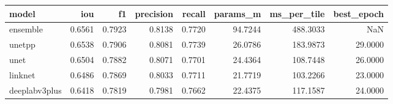 \begin{tabular}{lrrrrrrr}
\toprule
model & iou & f1 & precision & recall & params_m & ms_per_tile & best_epoch \\
\midrule
ensemble & 0.6561 & 0.7923 & 0.8138 & 0.7720 & 94.7244 & 488.3033 & NaN \\
unetpp & 0.6538 & 0.7906 & 0.8081 & 0.7739 & 26.0786 & 183.9873 & 29.0000 \\
unet & 0.6504 & 0.7882 & 0.8071 & 0.7701 & 24.4364 & 108.7448 & 26.0000 \\
linknet & 0.6486 & 0.7869 & 0.8033 & 0.7711 & 21.7719 & 103.2266 & 23.0000 \\
deeplabv3plus & 0.6418 & 0.7819 & 0.7981 & 0.7662 & 22.4375 & 117.1587 & 24.0000 \\
\bottomrule
\end{tabular}
